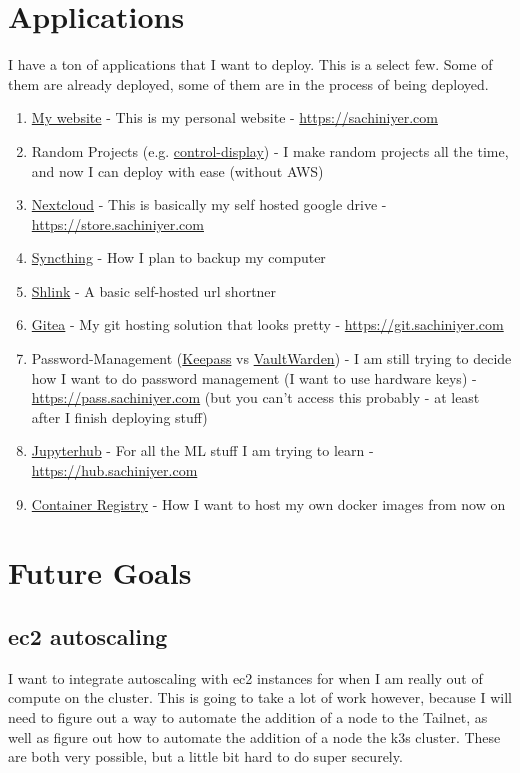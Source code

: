 \documentclass[12pt]{article}
\begin{document}
\section{Applications}
I have a ton of applications that I want to deploy. This is a select few. Some of them are already deployed, some of them are in the process of being deployed.
\begin{enumerate}
    \item \href{https://sachiniyer.com}{My website} - This is my personal website - \href{https://sachiniyer.com}{https://sachiniyer.com}
    \item Random Projects (e.g. \href{https://school-demo.sachiniyer.com}{control-display}) - I make random projects all the time, and now I can deploy with ease (without AWS)
    \item \href{https://nextcloud.com}{Nextcloud} - This is basically my self hosted google drive - \href{https://store.sachiniyer.com}{https://store.sachiniyer.com}
    \item \href{https://syncthing.net}{Syncthing} - How I plan to backup my computer
    \item \href{https://shlink.io}{Shlink} - A basic self-hosted url shortner
    \item \href{https://gitea.io}{Gitea} - My git hosting solution that looks pretty - \href{https://git.sachiniyer.com}{https://git.sachiniyer.com}
    \item Password-Management (\href{https://keepassxc.org}{Keepass} vs \href{https://github.com/dani-garcia/vaultwarden}{VaultWarden}) - I am still trying to decide how I want to do password management (I want to use hardware keys) - \href{https://pass.sachiniyer.com}{https://pass.sachiniyer.com} (but you can't access this probably - at least after I finish deploying stuff)
    \item \href{https://jupyterhub.readthedocs.io/en/stable/installation-guide.html}{Jupyterhub} - For all the ML stuff I am trying to learn - \href{https://hub.sachiniyer.com}{https://hub.sachiniyer.com}
    \item \href{https://docs.docker.com/registry/}{Container Registry} - How I want to host my own docker images from now on
\end{enumerate}

\section{Future Goals}
\subsection{ec2 autoscaling}
I want to integrate autoscaling with ec2 instances for when I am really out of compute on the cluster. This is going to take a lot of work however, because I will need to figure out a way to automate the addition of a node to the Tailnet, as well as figure out how to automate the addition of a node the k3s cluster. These are both very possible, but a little bit hard to do super securely.
\end{document}
